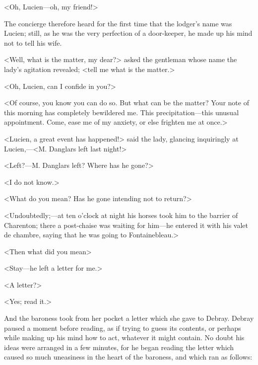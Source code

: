  <Oh, Lucien—oh, my friend!> 

 The concierge therefore heard for the first time that the lodger's name was Lucien; still, as he was the very perfection of a door-keeper, he made up his mind not to tell his wife. 

 <Well, what is the matter, my dear?> asked the gentleman whose name the lady's agitation revealed; <tell me what is the matter.> 

 <Oh, Lucien, can I confide in you?> 

 <Of course, you know you can do so. But what can be the matter? Your note of this morning has completely bewildered me. This precipitation—this unusual appointment. Come, ease me of my anxiety, or else frighten me at once.> 

 <Lucien, a great event has happened!> said the lady, glancing inquiringly at Lucien,—<M. Danglars left last night!> 

 <Left?—M. Danglars left? Where has he gone?> 

 <I do not know.> 

 <What do you mean? Has he gone intending not to return?> 

 <Undoubtedly;—at ten o'clock at night his horses took him to the barrier of Charenton; there a post-chaise was waiting for him—he entered it with his valet de chambre, saying that he was going to Fontainebleau.> 

 <Then what did you mean\longdash> 

 <Stay—he left a letter for me.> 

 <A letter?> 

 <Yes; read it.> 

 And the baroness took from her pocket a letter which she gave to Debray. Debray paused a moment before reading, as if trying to guess its contents, or perhaps while making up his mind how to act, whatever it might contain. No doubt his ideas were arranged in a few minutes, for he began reading the letter which caused so much uneasiness in the heart of the baroness, and which ran as follows: 


